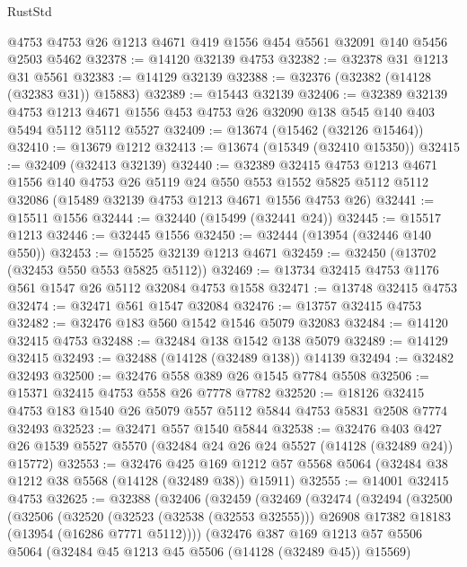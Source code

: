 \begin{lexlean}{RustStd}
\begin{coremodule}
    @4753
    @4753
    @26
    @1213
    @4671
    @419
    @1556
    @454
    @5561
    @32091
    @140
    @5456
    @2503
    @5462
@32378 := @14120 @32139 @4753
@32382 := @32378 @31 @1213 @31 @5561
@32383 := @14129 @32139
@32388 := @32376 (@32382 (@14128 (@32383 @31)) @15883)
@32389 := @15443 @32139
@32406 := @32389
    @32139
    @4753
    @1213
    @4671
    @1556
    @453
    @4753
    @26
    @32090
    @138
    @545
    @140
    @403
    @5494
    @5112
    @5112
    @5527
@32409 := @13674 (@15462 (@32126 @15464))
@32410 := @13679 @1212
@32413 := @13674 (@15349 (@32410 @15350))
@32415 := @32409 (@32413 @32139)
@32440 := @32389
    @32415
    @4753
    @1213
    @4671
    @1556
    @140
    @4753
    @26
    @5119
    @24
    @550
    @553
    @1552
    @5825
    @5112
    @5112
    @32086
    (@15489 @32139 @4753 @1213 @4671 @1556 @4753 @26)
@32441 := @15511 @1556
@32444 := @32440 (@15499 (@32441 @24))
@32445 := @15517 @1213
@32446 := @32445 @1556
@32450 := @32444 (@13954 (@32446 @140 @550))
@32453 := @15525 @32139 @1213 @4671
@32459 := @32450 (@13702 (@32453 @550 @553 @5825 @5112))
@32469 := @13734 @32415 @4753 @1176 @561 @1547 @26 @5112 @32084 @4753 @1558
@32471 := @13748 @32415 @4753
@32474 := @32471 @561 @1547 @32084
@32476 := @13757 @32415 @4753
@32482 := @32476 @183 @560 @1542 @1546 @5079 @32083
@32484 := @14120 @32415 @4753
@32488 := @32484 @138 @1542 @138 @5079
@32489 := @14129 @32415
@32493 := @32488 (@14128 (@32489 @138)) @14139
@32494 := @32482 @32493
@32500 := @32476 @558 @389 @26 @1545 @7784 @5508
@32506 := @15371 @32415 @4753 @558 @26 @7778 @7782
@32520 := @18126 @32415 @4753 @183 @1540 @26 @5079 @557 @5112 @5844 @4753 @5831 @2508 @7774 @32493
@32523 := @32471 @557 @1540 @5844
@32538 := @32476
    @403
    @427
    @26
    @1539
    @5527
    @5570
    (@32484 @24 @26 @24 @5527 (@14128 (@32489 @24)) @15772)
@32553 := @32476
    @425
    @169
    @1212
    @57
    @5568
    @5064
    (@32484 @38 @1212 @38 @5568 (@14128 (@32489 @38)) @15911)
@32555 := @14001 @32415 @4753
@32625 := @32388
    (@32406
      (@32459
        (@32469
          (@32474
            (@32494
              (@32500
                (@32506
                  (@32520
                    (@32523 (@32538 (@32553 @32555)))
                    @26908
                    @17382
                    @18183
                    (@13954 (@16286 @7771 @5112))))
                (@32476
                  @387
                  @169
                  @1213
                  @57
                  @5506
                  @5064
                  (@32484 @45 @1213 @45 @5506 (@14128 (@32489 @45)) @15569)

\end{coremodule}
\end{lexlean}
